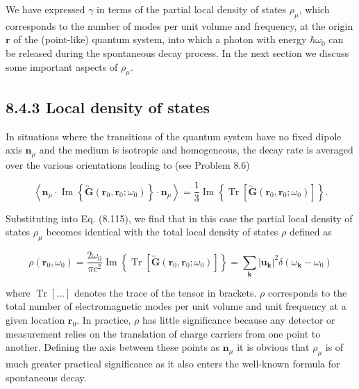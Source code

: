 \documentclass[10pt]{article}
\begin{document}
We have expressed $\gamma$ in terms of the partial local density of states $\rho_{\mu}$, which corresponds to the number of modes per unit volume and frequency, at the origin $\mathbf{r}$ of the (point-like) quantum system, into which a photon with energy $\hbar \omega_{0}$ can be released during the spontaneous decay process. In the next section we discuss some important aspects of $\rho_{\mu}$.

\subsection*{8.4.3 Local density of states}
In situations where the transitions of the quantum system have no fixed dipole axis $\mathbf{n}_{\mu}$ and the medium is isotropic and homogeneous, the decay rate is averaged over the various orientations leading to (see Problem 8.6)


\begin{equation*}
\left\langle\mathbf{n}_{\mu} \cdot \operatorname{Im}\left\{\overleftrightarrow{\mathbf{G}}\left(\mathbf{r}_{0}, \mathbf{r}_{0} ; \omega_{0}\right)\right\} \cdot \mathbf{n}_{\mu}\right\rangle=\frac{1}{3} \operatorname{Im}\left\{\operatorname{Tr}\left[\overleftrightarrow{\mathbf{G}}\left(\mathbf{r}_{0}, \mathbf{r}_{0} ; \omega_{0}\right)\right]\right\} . \tag{8.116}
\end{equation*}


Substituting into Eq. (8.115), we find that in this case the partial local density of states $\rho_{\mu}$ becomes identical with the total local density of states $\rho$ defined as


\begin{equation*}
\rho\left(\mathbf{r}_{0}, \omega_{0}\right)=\frac{2 \omega_{0}}{\pi c^{2}} \operatorname{Im}\left\{\operatorname{Tr}\left[\overleftrightarrow{\mathbf{G}}\left(\mathbf{r}_{0}, \mathbf{r}_{0} ; \omega_{0}\right)\right]\right\}=\sum_{\mathbf{k}}\left|\mathbf{u}_{\mathbf{k}}\right|^{2} \delta\left(\omega_{\mathbf{k}}-\omega_{0}\right) \tag{8.117}
\end{equation*}


where $\operatorname{Tr}[\ldots]$ denotes the trace of the tensor in brackets. $\rho$ corresponds to the total number of electromagnetic modes per unit volume and unit frequency at a given location $\mathbf{r}_{0}$. In practice, $\rho$ has little significance because any detector or measurement relies on the translation of charge carriers from one point to another. Defining the axis between these points as $\mathbf{n}_{\mu}$ it is obvious that $\rho_{\mu}$ is of much greater practical significance as it also enters the well-known formula for spontaneous decay.
\end{document}
